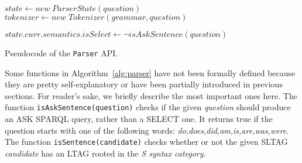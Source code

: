 \begin{algorithm}[t]
\label{alg:parser}

 {
	$state \leftarrow new\; ParserState(question)$ \\
	$tokenizer \leftarrow new\; Tokenizer(grammar,question)$ \\
	

	

	$state.curr.semantics.isSelect \leftarrow \neg isAskSentence(question)$ \\
	
}
\caption{Pseudocode of the \texttt{Parser} API.}
\end{algorithm}

Some functions in Algorithm~\ref{alg:parser} have not been formally defined because they are pretty self-explanatory or have been partially introduced in previous sections.
%
For reader's sake, we briefly describe the most important ones here.
%
The function \texttt{isAskSentence(question)} checks if the given \textit{question} should produce an ASK SPARQL query, rather than a SELECT one. It returns true if the question starts with one of the following words: \textit{do,does,did,am,is,are,was,were}.
%
The function \texttt{isSentence(candidate)} checks whether or not the given SLTAG \textit{candidate} has an LTAG rooted in the \textit{S syntax category}.

